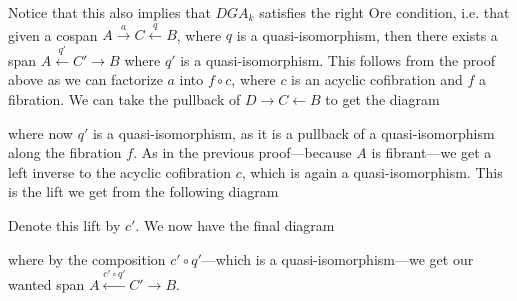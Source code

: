 Notice that this also implies that $DGA_k$ satisfies the right Ore condition, i.e. that given a cospan $A\overset{a}\rightarrow C \overset{q}\leftarrow B$, where $q$ is a quasi-isomorphism, then there exists a span $A\overset{q'}\leftarrow C' \rightarrow B$ where $q'$ is a quasi-isomorphism. This follows from the proof above as we can factorize $a$ into $f\circ c$, where $c$ is an acyclic cofibration and $f$ a fibration. We can take the pullback of $D\rightarrow C\leftarrow B$ to get the diagram
\begin{center}
\end{center}
where now $q'$ is a quasi-isomorphism, as it is a pullback of a quasi-isomorphism along the fibration $f$. As in the previous proof---because $A$ is fibrant---we get a left inverse to the acyclic cofibration $c$, which is again a quasi-isomorphism. This is the lift we get from the following diagram
\begin{center}
\end{center}
Denote this lift by $c'$. We now have the final diagram
\begin{center}
\end{center}
where by the composition $c'\circ q'$---which is a quasi-isomorphism---we get our wanted span $A\overset{c'\circ q'}\leftarrow C'\rightarrow B$. 

